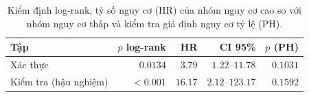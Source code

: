 \begin{table}[H]
\centering\small
\caption[Log-rank và HR theo nhóm nguy cơ]{Kiểm định log-rank, tỷ số nguy cơ (HR) của nhóm nguy cơ cao so với nhóm nguy cơ thấp và kiểm tra giả định nguy cơ tỷ lệ (PH).}
\label{tab:km-statistics}
\begin{tabularx}{\linewidth}{@{}Y r r r r@{}}
\toprule
\textbf{Tập} & \textbf{$p$ log-rank} & \textbf{HR} & \textbf{CI 95\%} & \textbf{$p$ (PH)} \\
\midrule
Xác thực & $\mathbf{0.0134}$ & $\mathbf{3.79}$ & $1.22$--$11.78$ & $0.1031$ \\
Kiểm tra (hậu nghiệm) & $\mathbf{<0.001}$ & $\mathbf{16.17}$ & $2.12$--$123.17$ & $0.1592$ \\
\bottomrule
\end{tabularx}
\end{table}
